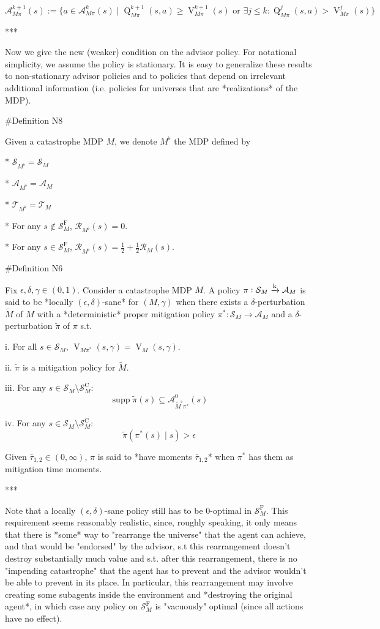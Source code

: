 \documentclass[a4paper]{article}
\DeclareMathOperator{\Supp}{supp}
\newcommand{\AP}[1]{\left(#1\right)}
\newcommand{\M}{\xrightarrow{\textnormal{k}}}
\newcommand{\A}{\mathcal{A}}
\newcommand{\St}{\mathcal{S}}
\newcommand{\T}{\mathcal{T}}
\newcommand{\R}{\mathcal{R}}
\newcommand{\RMC}{\mathrm{C}}
\newcommand{\RMF}{\mathrm{F}}
\newcommand{\SF}{\St^{\RMF}}
\newcommand{\SC}{\St^{\RMC}}
\newcommand{\V}{\operatorname{V}}
\newcommand{\Q}{\operatorname{Q}}
\begin{document}
$$\A_{M\pi}^{k+1}(s) := \{a \in \A_{M\pi}^k(s) \mid \Q_{M\pi}^{k+1}(s,a) \geq \V_{M\pi}^{k+1}(s) \text{ or } \exists j \leq k: \Q_{M\pi}^{j}(s,a) > \V_{M\pi}^{j}(s)\}$$

***

Now we give the new (weaker) condition on the advisor policy. For notational simplicity, we assume the policy is stationary. It is easy to generalize these results to non-stationary advisor policies and to policies that depend on irrelevant additional information (i.e. policies for universes that are *realizations* of the MDP).

\#Definition N8

Given a catastrophe MDP $M$, we denote $M^\flat$ the MDP defined by

* $\St_{M^\flat} = \St_M$

* $\A_{M^\flat} = \A_M$

* $\T_{M^\flat} = \T_M$

* For any $s\not\in\SF_M$, $\R_{M^\flat}(s) = 0$.

* For any $s \in \SF_M$, $\R_{M^\flat}(s) = \frac{1}{2} + \frac{1}{2}\R_M(s)$.

\#Definition N6

Fix $\epsilon,\delta,\gamma \in (0,1)$. Consider a catastrophe MDP $M$. A policy $\pi: \St_M \M \A_M$ is said to be *locally $(\epsilon,\delta)$-sane* for $(M,\gamma)$ when there exists a $\delta$-perturbation $\tilde{M}$ of $M$ with a *deterministic* proper mitigation policy $\pi^*: \St_M \rightarrow \A_M$ and a $\delta$-perturbation $\tilde{\pi}$ of $\pi$ s.t.

i. For all $s \in \St_M$, $\V_{M\pi^*}(s,\gamma) = \V_M(s,\gamma)$.

ii. $\tilde{\pi}$ is a mitigation policy for $\tilde{M}$.

iii. For any $s \in \St_M \setminus \SC_M$: $$\Supp{\tilde{\pi}(s)} \subseteq \A_{\tilde{M}^\flat\pi^*}^0(s)$$

iv. For any $s \in \St_M \setminus \SC_M$: $$\tilde{\pi}\AP{\pi^*(s) \mid s} > \epsilon$$


Given $\bar{\tau}_{1,2} \in (0,\infty)$, $\pi$ is said to *have moments $\bar{\tau}_{1,2}$* when $\pi^*$ has them as mitigation time moments.

***

Note that a locally $(\epsilon,\delta)$-sane policy still has to be $0$-optimal in $\SF_M$. This requirement seems reasonably realistic, since, roughly speaking, it only means that there is *some* way to "rearrange the universe" that the agent can achieve, and that would be "endorsed" by the advisor, s.t this rearrangement doesn't destroy substantially much value and s.t. after this rearrangement, there is no "impending catastrophe" that the agent has to prevent and the advisor wouldn't be able to prevent in its place. In particular, this rearrangement may involve creating some subagents inside the environment and *destroying the original agent*, in which case any policy on $\SF_M$ is "vacuously" optimal (since all actions have no effect).
\end{document}
